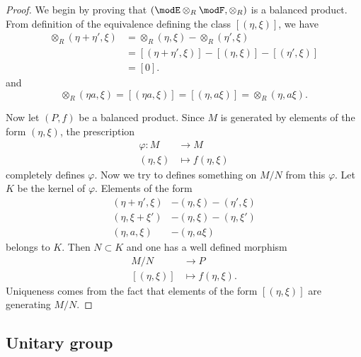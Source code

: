 \begin{proof}
	We begin by proving that $(\modE\otimes_R\modF,\otimes_R)$ is a balanced product. From definition of the equivalence defining the class $[(\eta,\xi)]$, we have
	\[
		\begin{split}
			\otimes_R(\eta+\eta',\xi)&=\otimes_R(\eta,\xi)-\otimes_R(\eta',\xi)\\
			&=[(\eta+\eta',\xi)]-[(\eta,\xi)]-[(\eta',\xi)]\\
			&=[0].
		\end{split}
	\]
	and
	\[
		\otimes_R(\eta a,\xi)=[(\eta a,\xi)]=[(\eta,a\xi)]=\otimes_R(\eta, a\xi).
	\]

	Now let $(P,f)$ be a balanced product. Since $M$ is generated by elements of the form $(\eta,\xi)$, the prescription
	\begin{equation}
		\begin{aligned}
			\varphi\colon M & \to M               \\
			(\eta,\xi)      & \mapsto f(\eta,\xi)
		\end{aligned}
	\end{equation}
	completely defines $\varphi$. Now we try to defines something on $M/N$ from this $\varphi$. Let $K$ be the kernel of $\varphi$. Elements of the form
	\[
		\begin{split}
			(\eta+\eta',\xi)&-(\eta,\xi)-(\eta',\xi)\\
			(\eta,\xi+\xi')&-(\eta,\xi)-(\eta,\xi')\\
			(\eta,a,\xi)&-(\eta, a\xi)
		\end{split}
	\]
	belongs to $K$. Then $N\subset K$ and one has a well defined morphism
	\begin{equation}
		\begin{aligned}
			M/N          & \to P                \\
			[(\eta,\xi)] & \mapsto f(\eta,\xi).
		\end{aligned}
	\end{equation}
	Uniqueness comes from the fact that elements of the form $[(\eta,\xi)]$ are generating $M/N$.

\end{proof}





\subsection{Unitary group}		\label{SubsecUnitGroup}

